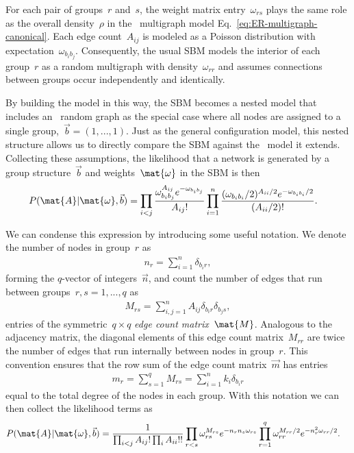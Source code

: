 For each pair of groups~$r$ and~$s$, the weight matrix entry~$\omega_{rs}$ plays the same role as the overall density~$\rho$ in the \ER~multigraph model Eq.~\eqref{eq:ER-multigraph-canonical}. Each edge count~$A_{ij}$ is modeled as a Poisson distribution with expectation~$\omega_{b_ib_j}$. Consequently, the usual SBM models the interior of each group~$r$ as a random multigraph with density~$\omega_{rr}$ and assumes connections between groups occur independently and identically. 

By building the model in this way, the SBM becomes a nested model that includes an \ER~random graph as the special case where all nodes are assigned to a single group,~$\vec{b} = (1,...,1)$. Just as the general configuration model, this nested structure allows us to directly compare the SBM against the \ER~model it extends. Collecting these assumptions, the likelihood that a network is generated by a group structure~$\vec{b}$ and weights~$\mat{\omega}$ in the SBM is then
\begin{align}
    P(\mat{A}|\mat{\omega},\vec{b}) &= \prod_{i < j}\frac{\omega_{b_ib_j}^{A_{ij}}e^{-\omega_{b_ib_j}}}{A_{ij}!}  \prod_{i=1}^n \frac{(\omega_{b_ib_i}/2)^{A_{ii}/2}e^{-\omega_{b_ib_i}/2}}{(A_{ii}/2)!}. \label{eq:P-A-given-omega-b}
\end{align}

We can condense this expression by introducing some useful notation. We denote the number of nodes in group~$r$ as \begin{align}
    n_r = \sum_{i=1}^n \delta_{b_ir},
\end{align}
forming the $q$-vector of integers~$\vec{n}$, and count the number of edges that run between groups~$r, s = 1,...,q$ as \begin{align}
    M_{rs} = \sum_{i,j=1}^n A_{ij} \delta_{b_ir}\delta_{b_js}, \label{eq:M-edge-count-matrix}
\end{align}
entries of the symmetric~$q \times q$ \emph{edge count matrix}~$\mat{M}$. Analogous to the adjacency matrix, the diagonal elements of this edge count matrix~$M_{rr}$ are twice the number of edges that run internally between nodes in group~$r$. This convention ensures that the row sum of the edge count matrix~$\vec{m}$ has entries 
\begin{align}
    m_r = \sum_{s = 1}^q M_{rs} = \sum_{i=1}^n k_i \delta_{b_ir}
\end{align}
equal to the total degree of the nodes in each group. With this notation we can then collect the likelihood terms as
\begin{align}
    P(\mat{A}|\mat{\omega},\vec{b}) &= \frac{1}{\prod_{i<j}A_{ij}!\prod_i A_{ii}!!} \prod_{r<s}\omega_{rs}^{M_{rs}} e^{-n_rn_s \omega_{rs}}\prod_{r=1}^q \omega_{rr}^{M_{rr}/2} e^{-n_r^2 \omega_{rr}/2}.
\end{align}

